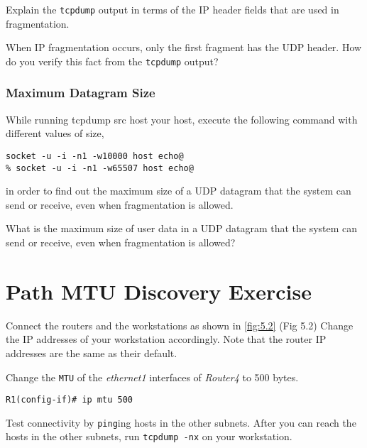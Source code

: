 \documentclass{../UTNetLab}
\begin{document}
    \begin{report}
    \item Explain the \lstinline{tcpdump} output in terms of the IP header fields that are used in fragmentation.

    \item When IP fragmentation occurs, only the first fragment has the UDP header.
    How do you verify this fact from the \lstinline{tcpdump} output?
    \end{report}


\section{Maximum Datagram Size}
\label{sec:MaxDatagramSize}
    While running tcpdump src host your host, execute the following command with different values of size,
    \begin{lstlisting}[emph={host}]
socket -u -i -n1 -w10000 host echo@
% socket -u -i -n1 -w65507 host echo@
    \end{lstlisting}
    in order to find out the maximum size of a UDP datagram that the system can send or receive, even when fragmentation is allowed.

    \begin{report}
    \item What is the maximum size of user data in a UDP datagram that the system can send or receive, even when fragmentation is allowed?
    \end{report}


\part{Path MTU Discovery Exercise}
    Connect the routers and the workstations as shown in \autoref{fig:5.2} (Fig 5.2) Change the IP
    addresses of your workstation accordingly. Note that the router IP addresses are
    the same as their default.


    Change the \texttt{MTU} of the \textit{ethernet1} interfaces of \textit{Router4} to 500
    bytes.
    \begin{lstlisting}[language={cisco}]
R1(config-if)# ip mtu 500
    \end{lstlisting}
    Test connectivity by \lstinline{ping}ing hosts in the other subnets. After you can reach the
    hosts in the other subnets, run \lstinline{tcpdump -nx} on your workstation.
\end{document}
